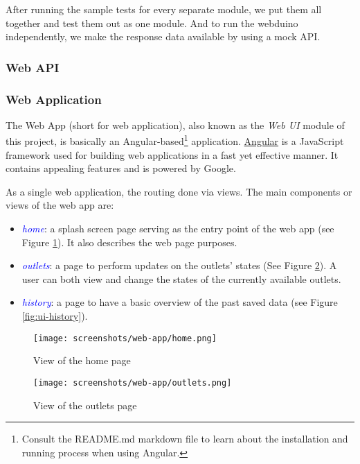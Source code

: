 After running the sample tests for every separate module, we put them all together and test them out as one module. And to run the webduino independently, we make the response data available by using a mock API.

\subsubsection{Web API}


\subsubsection{Web Application}
The Web App (short for web application), also known as the \emph{Web UI} module of this project, is basically an Angular-based\footnote{Consult the README.md markdown file to learn about the installation and running process when using Angular.} application. \href{https://angular.io}{Angular} is a JavaScript framework used for building web applications in a fast yet effective manner. It contains appealing features and is powered by Google.

As a single web application, the routing done via views. The main components or views of the web app are:
\begin{itemize}
    \item \textit{\textcolor{blue}{home}}: a splash screen page serving as the entry point of the web app (see Figure \ref{fig:ui-home}). It also describes the web page purposes.
    \item \textit{\textcolor{blue}{outlets}}: a page to perform updates on the outlets' states (See Figure \ref{fig:ui-outlets}). A user can both view and change the states of the currently available outlets.
    \item \textit{\textcolor{blue}{history}}: a page to have a basic overview of the past saved data (see Figure \ref{fig:ui-history}).
\end{itemize}

\begin{figure}[ht!]
    \centering
    \texttt{[image: screenshots/web-app/home.png]}
    \caption{View of the home page}
    \label{fig:ui-home}
\end{figure}

\begin{figure}[ht!]
    \centering
    \texttt{[image: screenshots/web-app/outlets.png]}
    \caption{View of the outlets page}
    \label{fig:ui-outlets}
\end{figure}

